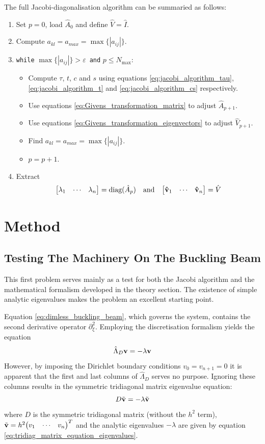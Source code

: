 \documentclass[reprint,english]{revtex4-1}
\begin{document}
The full Jacobi-diagonalisation algorithm can be summaried as follows:
\begin{enumerate}
\item Set \(p=0\), load \(\hat{A}_0\) and define \(\hat{V}=\hat{I}\).
\item Compute \(a_{kl}=a_{max}=\max\{|a_{ij}|\}\).
\item \texttt{while} \(\max\{|a_{ij}|\}>\varepsilon\,\) \texttt{and} \(p\leq N_{\text{max}}\):
	\begin{itemize}
	\item[]Compute \(\tau\), \(t\), \(c\) and \(s\) using equations \eqref{eq:jacobi_algorithm_tau}, \eqref{eq:jacobi_algorithm_t} and 	\eqref{eq:jacobi_algorithm_cs} respectively.
	\item[]Use equations \eqref{eq:Givens_transformation_matrix} to adjust \(\hat{A}_{p+1}\).
	\item[]Use equations \eqref{eq:Givens_transformation_eigenvectors} to adjust \(\hat{V}_{p+1}\).
	\item[]Find \(a_{kl}=a_{max}=\max\{|a_{ij}|\}\).
	\item[]\(p=p+1\).
	\end{itemize}
\item Extract
\[\mqty[\lambda_1&\cdots&\lambda_n]=\text{diag}(\hat{A}_p)\qand\mqty[\vu{v}_1&\cdots&\vu{v}_n]=\hat{V}\]
\end{enumerate}

\section{Method}
\subsection{Testing The Machinery On The Buckling Beam}
This first problem serves mainly as a test for both the Jacobi algorithm and the mathematical formalism developed in the theory section. The existence of simple analytic eigenvalues makes the problem an excellent starting point.

Equation \eqref{eq:dimless_buckling_beam}, which governs the system, contains the second derivative operator \(\partial_\xi^2\). Employing the discretisation formalism yields the equation
\begin{equation}\label{eq:discrete_dimless_buckling_beam}
\hat{\Lambda}_D\vb{v}=-\lambda\vb{v}
\end{equation}
However, by imposing the Dirichlet boundary conditions \(v_0=v_{n+1}=0\) it is apparent that the first and last columns of \(\hat{\Lambda}_D\) serves no purpose. Ignoring these columns results in the symmetric tridiagonal matrix eigenvalue equation:
\begin{equation}\label{eq:method:buckling_beam}
D\tilde{\vb{v}}=-\lambda\tilde{\vb{v}}
\end{equation}
where \(D\) is the symmetric tridiagonal matrix (without the \(h^2\) term), \(\tilde{\vb{v}}=h^2\mqty(v_1&\cdots&v_n)^T\) and the analytic eigenvalues \(-\lambda\) are given by equation \eqref{eq:tridiag_matrix_equation_eigenvalues}.
\end{document}
